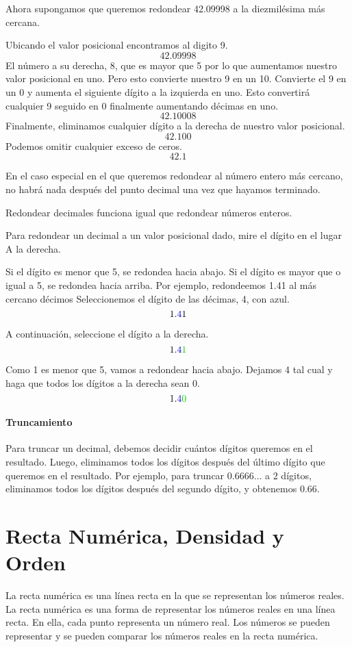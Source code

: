 \documentclass[12pt]{book}
\begin{document}
\begin{mainmatter}
    Ahora supongamos que queremos redondear 42.09998 a la diezmilésima más cercana.

    Ubicando el valor posicional encontramos al digito 9.
    \[42.099\boxed{9} \boxed{8}\]
    El número a su derecha, 8, que es mayor que 5 por lo que aumentamos nuestro valor posicional en uno. Pero
    esto convierte nuestro 9 en un 10. Convierte el 9 en un 0 y aumenta
    el siguiente dígito a la izquierda en uno. Esto convertirá cualquier 9 seguido en 0
    finalmente aumentando décimas en uno.
    \[42. \boxed{100}\boxed{0}\boxed{8}\]
    Finalmente, eliminamos cualquier dígito a la derecha de nuestro valor posicional.
    \[42.100\]
    Podemos omitir cualquier exceso de ceros.
    \[42.1\]

    En el caso especial en el que queremos redondear al número entero más cercano,
    no habrá nada después del punto decimal una vez que hayamos terminado.

    Redondear decimales funciona igual que redondear números enteros.

    Para redondear un decimal a un valor posicional dado, mire el dígito en el lugar
    A la derecha.

    Si el dígito es menor que 5, se redondea hacia abajo. Si el dígito es mayor que
    o igual a 5, se redondea hacia arriba. Por ejemplo, redondeemos 1.41 al más cercano
    décimos Seleccionemos el dígito de las décimas, 4, con azul.
    \[1. {\color{blue!80!black} 4 } 1\]

    A continuación, seleccione el dígito a la derecha.
    \[1. {\color{blue!80!black} 4 } {\color{green!80!black} 1 }\]

    Como 1 es menor que 5, vamos a redondear hacia abajo. Dejamos 4 tal cual y
    haga que todos los dígitos a la derecha sean 0.
    \[1. {\color{blue!80!black} 4 } {\color{green!80!black} 0 }\]

    \paragraph{Truncamiento} Para truncar un decimal, debemos decidir cuántos dígitos queremos en el resultado. Luego, eliminamos todos los dígitos después del último dígito que queremos en el resultado.
    Por ejemplo, para truncar $0.6666\dots$ a $2$ dígitos, eliminamos todos los dígitos después del segundo dígito, y obtenemos $0.66$.

    \section{Recta Num\'erica, Densidad y Orden}
    La recta numérica es una línea recta en la que se representan los números reales. La recta numérica es una forma de representar los números reales en una línea recta. En ella, cada punto representa un número real. Los números se pueden representar y se pueden comparar los números reales en la recta numérica.


\end{mainmatter}
\end{document}
